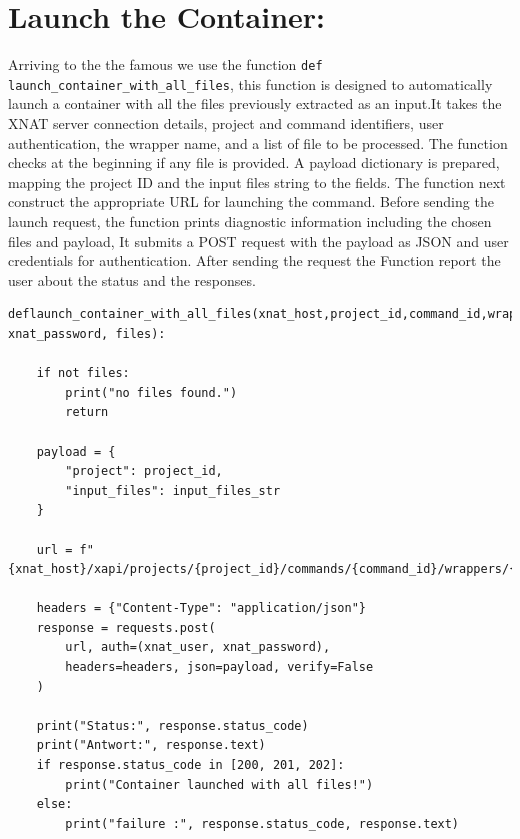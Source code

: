 \section{Launch the Container:}
Arriving to the the famous we use the function \texttt{def launch\_container\_with\_all\_files}, this function is designed to automatically launch a container with all the files previously extracted as an input.It takes the XNAT server connection details, project and command identifiers, user authentication, the wrapper name, and a list of file to be processed. The function checks at the beginning if any file is provided. A payload dictionary is prepared, mapping the project ID and the input files string to the fields. The function next construct the appropriate URL for launching the command. Before sending the launch request, the function prints diagnostic information including the chosen files and payload, It submits a POST request with the payload as JSON and user credentials for authentication. After sending the request the Function report the user about the status and the responses.



\begin{lstlisting}
deflaunch_container_with_all_files(xnat_host,project_id,command_id,wrapper_name,xnat_user, xnat_password, files):
   
    if not files:
        print("no files found.")
        return 

    payload = {
        "project": project_id,
        "input_files": input_files_str
    }

    url = f"{xnat_host}/xapi/projects/{project_id}/commands/{command_id}/wrappers/{wrapper_name}/root/project/launch"

    headers = {"Content-Type": "application/json"}
    response = requests.post(
        url, auth=(xnat_user, xnat_password),
        headers=headers, json=payload, verify=False
    )

    print("Status:", response.status_code)
    print("Antwort:", response.text)
    if response.status_code in [200, 201, 202]:
        print("Container launched with all files!")
    else:
        print("failure :", response.status_code, response.text)
\end{lstlisting}



















